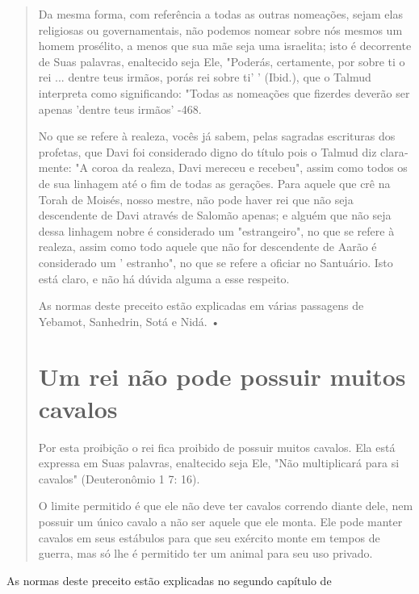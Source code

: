 \begin{quote}
Da mesma forma, com referência a todas as outras nomeações, se­jam elas
religiosas ou governamentais, não podemos nomear sobre nós mes­mos um
homem prosélito, a menos que sua mãe seja uma israelita; isto é
decor­rente de Suas palavras, enaltecido seja Ele, "Poderás, certamente,
por sobre ti o rei ... dentre teus irmãos, porás rei sobre ti' '
(Ibid.), que o Talmud interpreta como significando: "Todas as nomeações
que fizerdes deverão ser apenas 'dentre teus irmãos' -468.

No que se refere à realeza, vocês já sabem, pelas sagradas escrituras
dos profetas, que Davi foi considerado digno do título pois o Talmud diz
clara­mente: "A coroa da realeza, Davi mereceu e recebeu", assim como
todos os de sua linhagem até o fim de todas as gerações. Para aquele que
crê na Torah de Moisés, nosso mestre, não pode haver rei que não seja
descendente de Davi atra­vés de Salomão apenas; e alguém que não seja
dessa linhagem nobre é conside­rado um "estrangeiro", no que se refere à
realeza, assim como todo aquele que não for descendente de Aarão é
considerado um ' estranho", no que se refere a oficiar no Santuário.
Isto está claro, e não há dúvida alguma a esse respeito.

As normas deste preceito estão explicadas em várias passagens de
Yebamot, Sanhedrin, Sotá e Nidá. •

\section{Um rei não pode possuir muitos cavalos}

Por esta proibição o rei fica proibido de possuir muitos cavalos. Ela
está expressa em Suas palavras, enaltecido seja Ele, "Não multiplicará
para si cavalos" (Deuteronômio 1 7: 16).

O limite permitido é que ele não deve ter cavalos correndo diante dele,
nem possuir um único cavalo a não ser aquele que ele monta. Ele pode
manter cavalos em seus estábulos para que seu exército monte em tempos
de guerra, mas só lhe é permitido ter um animal para seu uso privado.
\end{quote}

As normas deste preceito estão explicadas no segundo capítulo de

